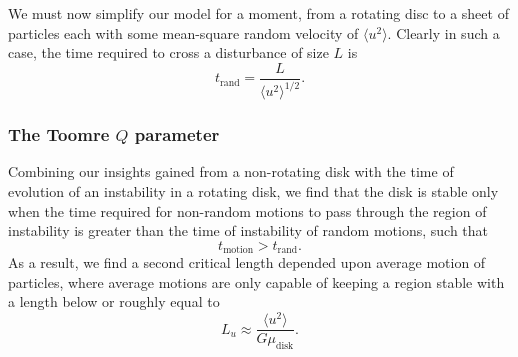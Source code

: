 \documentclass[aps,pra,twocolumn]{revtex4-1}
\begin{document}
We must now simplify our model for a moment, from a rotating disc to a sheet of particles each with some mean-square random velocity of $\langle u^2 \rangle$. Clearly in such a case, the time required to cross a disturbance of size $L$ is
\begin{equation}
t_\text{rand} = \frac{L}{\langle u^2 \rangle^{1/2}}.
\end{equation}

\subsubsection{\label{section 3.1.3} The Toomre $Q$ parameter}
Combining our insights gained from a non-rotating disk with the time of evolution of an instability in a rotating disk, we find that the disk is stable only when the time required for non-random motions to pass through the region of instability is greater than the time of instability of random motions, such that
\begin{equation}
t_\text{motion} > t_\text{rand}.
\end{equation}
As a result, we find a second critical length depended upon average motion of particles, where average motions are only capable of keeping a region stable with a length below or roughly equal to
\begin{equation}
L_u \approx \frac{\langle u^2 \rangle}{G\mu_\text{disk}}. \label{crit2.1}
\end{equation}
\end{document}
